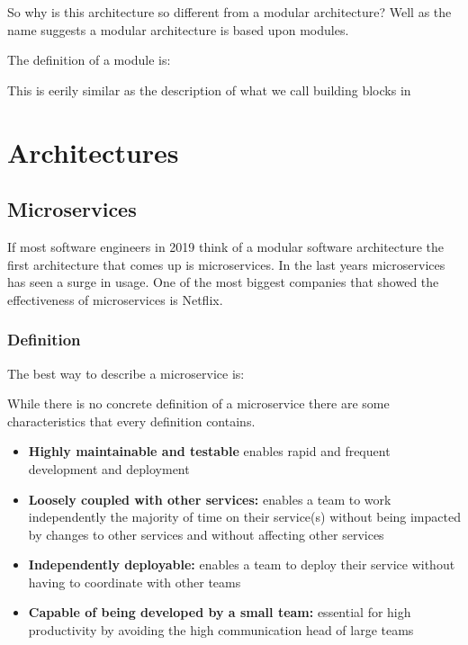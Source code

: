 So why is this architecture so different from a modular architecture? Well as the name suggests a modular architecture is based upon modules.

The definition of a module is:

This is eerily similar as the description of what we call building blocks in 

\section{Architectures}
\label{sec:Architectures}

\subsection{Microservices}
If most software engineers in 2019 think of a modular software architecture the first architecture that comes up is microservices. In the last years microservices has seen a surge in usage. One of the most biggest companies that showed the effectiveness of microservices is Netflix.

\subsubsection{Definition}
The best way to describe a microservice is:

While there is no concrete definition of a microservice there are some characteristics that
every definition contains.
\begin{itemize}
        \item \textbf{Highly maintainable and testable} enables rapid and frequent development and deployment
        
        \item \textbf{Loosely coupled with other services:} enables a team to work independently the majority of time on their service(s) without being impacted by changes to other services and without affecting other services
        
        \item \textbf{Independently deployable:} enables a team to deploy their service without having to coordinate with other teams
        
        \item \textbf{Capable of being developed by a small team:} essential for high productivity by avoiding the high communication head of large teams \cite{microservicesCharactaristics}
\end{itemize}

